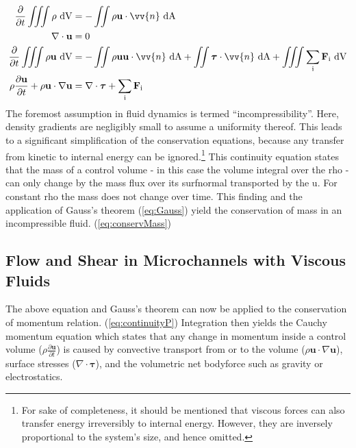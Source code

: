 \begin{align}
	\frac{\partial}{\partial t} \iiint \rho \ \mathrm{dV} &= - \iint \rho \mathbf{u} \cdot \vv{n} \ \mathrm{dA} \label{eq:continuityM}\\
	\nabla \cdot \mathbf{u} &= 0 \label{eq:conservMass}\\	
	\frac{\partial}{\partial t} \iiint \rho\mathbf{u} \ \mathrm{dV} &= - \iint \rho \mathbf{u}\mathbf{u} \cdot \vv{n} \ \mathrm{dA} + \iint \boldsymbol{\tau} \cdot \vv{n} \ \mathrm{dA}  + \iiint  \sum_\text{i}\mathbf{F}_\text{i} \ \mathrm{dV} \label{eq:continuityP} \\	
		\rho \frac{\partial \mathbf{u}}{\partial t} + \rho\mathbf{u} \cdot \nabla \mathbf{u} &= \nabla \cdot \boldsymbol{\tau} + \sum_\text{i}\mathbf{F}_\text{i} \label{eq:cauchymomentum} \\			
\end{align}
The foremost assumption in fluid dynamics is termed ``incompressibility''. Here, density gradients are negligibly small to assume a uniformity thereof. This leads to a significant simplification of the conservation equations, because any transfer from kinetic to internal energy can be ignored.\footnote{For sake of completeness, it should be mentioned that viscous forces can also transfer energy irreversibly to internal energy. However, they are inversely proportional to the system's size, and hence omitted.}
This continuity equation states that the mass of a control volume - in this case the volume integral over the \gls{rho} - can only change by the mass flux over its \gls{surfnormal} transported by the \gls{u}. For constant \gls{rho} the mass does not change over time. This finding and the application of Gauss's theorem (\cref{eq:Gauss}) yield the conservation of mass in an incompressible fluid. (\cref{eq:conservMass})


\subsection{Flow and Shear in Microchannels with Viscous Fluids}
\label{sec:theo:flow_and_Shear}

The above equation and Gauss's theorem can now be applied to the conservation of momentum relation. (\cref{eq:continuityP}) Integration then yields the Cauchy momentum equation which states that any change in momentum inside a control volume ($\rho \frac{\partial \mathbf{u}}{\partial t}$) is caused by convective transport from or to the volume ($\rho\mathbf{u} \cdot \nabla \mathbf{u}$), surface stresses ($ \nabla \cdot \boldsymbol{\tau}$), and the volumetric net \gls{bodyforce} such as gravity or electrostatics.

